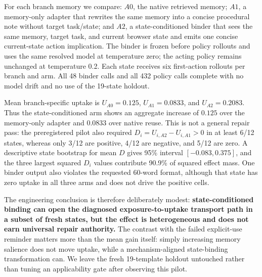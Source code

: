 For each branch memory we compare: $A0$, the native retrieved memory; $A1$, a memory-only adapter that rewrites the same memory into a concise procedural note without target task/state; and $A2$, a state-conditioned binder that sees the same memory, target task, and current browser state and emits one concise current-state action implication. The binder is frozen before policy rollouts and uses the same resolved model at temperature zero; the acting policy remains unchanged at temperature 0.2. Each state receives six first-action rollouts per branch and arm. All 48 binder calls and all 432 policy calls complete with no model drift and no use of the 19-state holdout.

Mean branch-specific uptake is $U_{A0}=0.125$, $U_{A1}=0.0833$, and $U_{A2}=0.2083$. Thus the state-conditioned arm shows an aggregate increase of $0.125$ over the memory-only adapter and $0.0833$ over native reuse. This is not a general repair pass: the preregistered pilot also required $D_i=U_{i,A2}-U_{i,A1}>0$ in at least 6/12 states, whereas only 3/12 are positive, 4/12 are negative, and 5/12 are zero. A descriptive state bootstrap for mean $D$ gives 95\% interval $[-0.083,0.375]$, and the three largest squared $D_i$ values contribute 90.9\% of squared effect mass. One binder output also violates the requested 60-word format, although that state has zero uptake in all three arms and does not drive the positive cells.

The engineering conclusion is therefore deliberately modest: \textbf{state-conditioned binding can open the diagnosed exposure-to-uptake transport path in a subset of fresh states, but the effect is heterogeneous and does not earn universal repair authority.} The contrast with the failed explicit-use reminder matters more than the mean gain itself: simply increasing memory salience does not move uptake, while a mechanism-aligned state-binding transformation can. We leave the fresh 19-template holdout untouched rather than tuning an applicability gate after observing this pilot.

